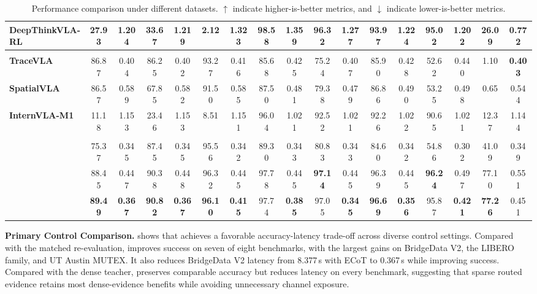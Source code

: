 \begin{table}[H]
{\begin{tabular}{p{}*{16}{c}}
\textbf{DeepThinkVLA-RL}
& 27.93 & 1.204 & 33.67 & 1.219 & 2.12 & 1.323
& \textbf{98.58} & 1.359 & 96.32 & 1.277 & 93.97 & 1.224
& 95.02 & 1.202 & 26.09 & 0.772 \\
\midrule
\rowcolor{tblgroupvisual}
\multicolumn{17}{c}{\textit{Spatial or image-grounded thinking}} \\
\textbf{TraceVLA}
& 86.87 & 0.404 & 86.25 & 0.402 & 93.27 & 0.416
& 85.68 & 0.425 & 75.24 & 0.407 & 85.90 & 0.428
& 52.62 & 0.440 & 1.10 & \textbf{0.403} \\
\textbf{SpatialVLA}
& 86.57 & 0.589 & 67.85 & 0.582 & 91.50 & 0.585
& 87.50 & 0.481 & 79.38 & 0.479 & 86.86 & 0.490
& 53.25 & 0.498 & 0.65 & 0.544 \\
\textbf{InternVLA-M1}
& 11.18 & 1.153 & 23.46 & 1.153 & 8.51 & 1.151
& 96.04 & 1.021 & 92.52 & 1.021 & 92.26 & 1.022
& 90.65 & 1.021 & 12.37 & 1.144 \\
\midrule
\rowcolor{tblgroupmatched}
\multicolumn{17}{c}{\textit{OpenVLA-family re-evaluation}} \\
\textbf{\basevla{}} 
& 75.37 & 0.345 & 87.45 & 0.345 & 95.56 & 0.342
& 89.30 & 0.343 & 80.83 & 0.343 & 84.60 & 0.342
& 54.86 & 0.302 & 41.09 & 0.349 \\
\textbf{\fullsoft{}}
& 88.45 & 0.447 & 90.38 & 0.448 & 96.32 & 0.445
& 97.78 & 0.445 & \textbf{97.14} & 0.445 & 96.39 & 0.445
& \textbf{96.24} & 0.497 & 77.10 & 0.551 \\
\rowcolor{tblours}
\textbf{\method{}}
& \textbf{89.49} & \textbf{0.367} & \textbf{90.82} & \textbf{0.367} & \textbf{96.10} & \textbf{0.415}
& 97.74 & \textbf{0.385} & 97.05 & \textbf{0.345} & \textbf{96.69} & \textbf{0.356}
& 95.87 & \textbf{0.421} & \textbf{77.26} & 0.451 \\
\bottomrule
\end{tabular}
}
\caption{Performance comparison under different datasets. $\uparrow$ indicate higher-is-better metrics, and $\downarrow$ indicate lower-is-better metrics.}
\label{tab:benchmark_suite}
\end{table}

\noindent
\textbf{Primary Control Comparison.}
 shows that \method{} achieves a favorable accuracy-latency trade-off across diverse control settings. Compared with the matched \basevla{} re-evaluation, \method{} improves success on seven of eight benchmarks, with the largest gains on BridgeData V2, the LIBERO family, and UT Austin MUTEX. It also reduces BridgeData V2 latency from 8.377\,s with ECoT to 0.367\,s while improving success. Compared with the dense \fullsoft{} teacher, \method{} preserves comparable accuracy but reduces latency on every benchmark, suggesting that sparse routed evidence retains most dense-evidence benefits while avoiding unnecessary channel exposure.

